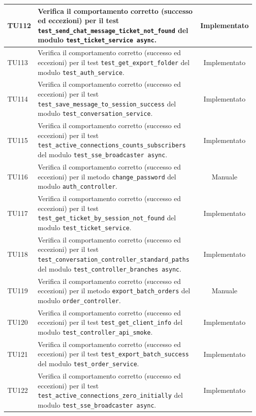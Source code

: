 \documentclass[a4paper,11pt,oneside]{scrartcl}
\begin{document}
\begin{longtable}{|p{1.9cm}|p{11.6cm}|c|}
    TU112 & Verifica il comportamento corretto (successo ed eccezioni) per il test \texttt{test\_send\_chat\_message\_ticket\_not\_found} del modulo \texttt{test\_ticket\_service     async}. & Implementato \\ \hline
    TU113 & Verifica il comportamento corretto (successo ed eccezioni) per il test \texttt{test\_get\_export\_folder} del modulo \texttt{test\_auth\_service}. & Implementato \\ \hline
    TU114 & Verifica il comportamento corretto (successo ed eccezioni) per il test \texttt{test\_save\_message\_to\_session\_success} del modulo \texttt{test\_conversation\_service}. & Implementato \\ \hline
    TU115 & Verifica il comportamento corretto (successo ed eccezioni) per il test \texttt{test\_active\_connections\_counts\_subscribers} del modulo \texttt{test\_sse\_broadcaster     async}. & Implementato \\ \hline
    TU116 & Verifica il comportamento corretto (successo ed eccezioni) per il metodo \texttt{change\_password} del modulo \texttt{auth\_controller}. & Manuale \\ \hline
    TU117 & Verifica il comportamento corretto (successo ed eccezioni) per il test \texttt{test\_get\_ticket\_by\_session\_not\_found} del modulo \texttt{test\_ticket\_service}. & Implementato \\ \hline
    TU118 & Verifica il comportamento corretto (successo ed eccezioni) per il test \texttt{test\_conversation\_controller\_standard\_paths} del modulo \texttt{test\_controller\_branches async}. & Implementato \\ \hline
    TU119 & Verifica il comportamento corretto (successo ed eccezioni) per il metodo \texttt{export\_batch\_orders} del modulo \texttt{order\_controller}. & Manuale \\ \hline
    TU120 & Verifica il comportamento corretto (successo ed eccezioni) per il test \texttt{test\_get\_client\_info} del modulo \texttt{test\_controller\_api\_smoke}. & Implementato \\ \hline
    TU121 & Verifica il comportamento corretto (successo ed eccezioni) per il test \texttt{test\_export\_batch\_success} del modulo \texttt{test\_order\_service}. & Implementato \\ \hline
    TU122 & Verifica il comportamento corretto (successo ed eccezioni) per il test \texttt{test\_active\_connections\_zero\_initially} del modulo \texttt{test\_sse\_broadcaster     async}. & Implementato \\ \hline

\end{longtable}
\end{document}
